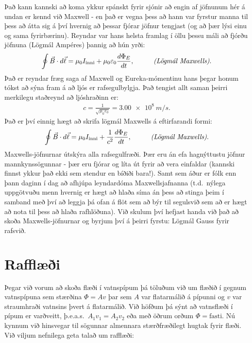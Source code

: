 \ifdefined \wholebook \else\documentclass[oneside]{book}\usepackage{EdlBook}\graphicspath{{figures/}}
\begin{document}
Það kann kannski að koma ykkur spánskt fyrir sjónir að engin af jöfnunum hér á undan er kennd við Maxwell - en það er vegna þess að hann var fyrstur manna til þess að átta sig á því hvernig að þessar fjórar jöfnur tengjast (og að þær lýsi einu og sama fyrirbærinu). Reyndar var hans helsta framlag í öllu þessu máli að  fjórðu jöfnuna (Lögmál Ampéres) þannig að hún yrði:
\begin{align*}
    \oint \vec{B} \cdot d\vec{\ell} = \mu_0 I_{\text{inni}} + \mu_0 \varepsilon_0 \frac{d\Phi_E}{dt}, \hspace{1cm} \text{\emph{(Lögmál Maxwells)}}.
\end{align*}
Það er reyndar fræg saga af Maxwell og Eureka-mómentinu hans þegar honum tókst að sýna fram á að ljós er rafsegulbylgja. Það tengist allt saman þeirri merkilegu staðreynd að ljóshraðinn er:
\begin{align*}
    c = \frac{1}{\sqrt{\mu_0 \varepsilon_0}} = \SI{3.00e8}{m/s}.
\end{align*}
Það er því einnig hægt að skrifa lögmál Maxwells á eftirfarandi formi:
\begin{align*}
    \oint \vec{B} \cdot d\vec{\ell} = \mu_0 I_{\text{inni}} + \frac{1}{c^2} \frac{d\Phi_E}{dt}, \hspace{1cm} \text{\emph{(Lögmál Maxwells)}}.
\end{align*}
Maxwells-jöfnurnar útskýra alla rafsegulfræði. Þær eru án efa hagnýttustu jöfnur mannkynssögunnar - þær eru fjórar og líta út fyrir að vera einfaldar (kannski finnst ykkur það ekki sem stendur en bíðiði bara!). Samt sem áður er fólk enn þann daginn í dag að afhjúpa leyndardóma Maxwellsjafnanna (t.d.~nýlega uppgötvuðu menn hvernig er hægt að hlaða síma án þess að stinga þeim í samband með því að leggja þá ofan á flöt sem að býr til segulsvið sem að er hægt að nota til þess að hlaða rafhlöðuna). Við skulum því hefjast handa við það að skoða Maxwells-jöfnurnar og byrjum því á þeirri fyrstu: Lögmál Gauss fyrir rafsvið.

\newpage

\section{Rafflæði}

Þegar við vorum að skoða flæði í vatnspípum þá töluðum við um flæðið í gegnum vatnspípuna sem stærðina $\Phi = Av$ þar sem $A$ var flatarmálið á pípunni og $v$ var straumhraði vatnsins þvert á flatarmálið. Við höfðum þá sýnt að vatnsflæði í pípum er varðveitt, þ.e.a.s.~$A_1v_1 = A_2 v_2$ eða með öðrum orðum $\Phi = \text{fasti}$. Nú kynnum við hinsvegar til sögunnar almennara stærðfræðilegt hugtak fyrir flæði. Við viljum nefnilega geta talað um rafflæði:
\end{document}

